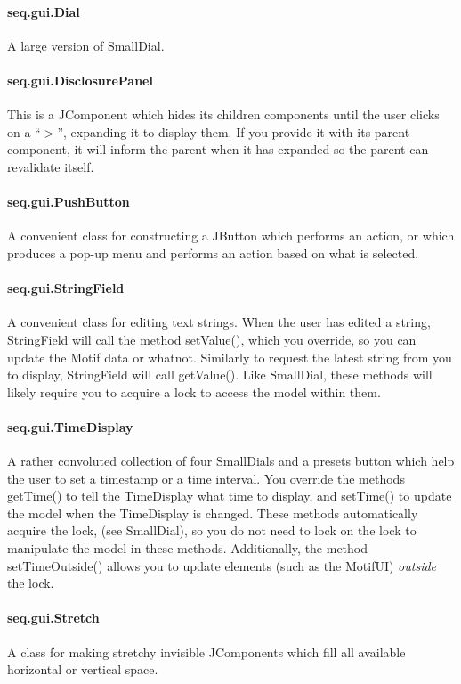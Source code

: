 \documentclass[twoside,10pt]{article}
\begin{document}
\paragraph{seq.gui.Dial}  A large version of SmallDial.

\paragraph{seq.gui.DisclosurePanel}  This is a JComponent which hides its children components until the user clicks on a ``\(>\)'', expanding it to display them.  If you provide it with its parent component, it will inform the parent when it has expanded so the parent can revalidate itself.

\paragraph{seq.gui.PushButton}  A convenient class for constructing a JButton which performs an action, or which produces a pop-up menu and performs an action based on what is selected.

\paragraph{seq.gui.StringField}  A convenient class for editing text strings.  When the user has edited a string, StringField will call the method {\sf setValue()}, which you override, so you can update the Motif data or whatnot.  Similarly to request the latest string from you to display, StringField will call {\sf getValue()}.  Like SmallDial, these methods will likely require you to acquire a lock to access the model within them.

\paragraph{seq.gui.TimeDisplay}  A rather convoluted collection of four SmallDials and a presets button which help the user to set a timestamp or a time interval.  You override the methods {\sf getTime()} to tell the TimeDisplay what time to display, and {\sf setTime()} to update the model when the TimeDisplay is changed.  These methods automatically acquire the lock, (see SmallDial), so you do not need to lock on the lock to manipulate the model in these methods.  Additionally, the method {\sf setTimeOutside()} allows you to update elements (such as the MotifUI) {\it outside} the lock.

\paragraph{seq.gui.Stretch}  A class for making stretchy invisible JComponents which fill all available horizontal or vertical space.
\end{document}
